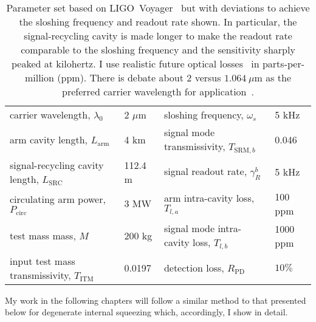 \begin{table}
\centering
\begin{tabular}{@{}ll|ll@{}}
\toprule
carrier wavelength, $\lambda_0$ & 2 $\mu\text{m}$ & sloshing frequency, $\omega_s$ & 5 kHz \\
arm cavity length, $L_\text{arm}$ & 4 km & signal mode transmissivity, $T_{\text{SRM},b}$ & 0.046 \\
signal-recycling cavity length, $L_\text{SRC}$ & 112.4 m & signal readout rate, $\gamma^b_R$ & 5 kHz \\
circulating arm power, $P_\text{circ}$ & 3 MW & arm intra-cavity loss, $T_{l,a}$ & 100 ppm \\
test mass mass, $M$ & 200 kg & signal mode intra-cavity loss, $T_{l,b}$ & 1000 ppm \\
input test mass transmissivity, $T_\text{ITM}$ & 0.0197 & detection loss, $R_\text{PD}$ & $10\%$ \\ \bottomrule
\end{tabular}
\caption{Parameter set based on LIGO~Voyager~\cite{LIGO_Voyager} but with deviations to achieve the sloshing frequency and readout rate shown. In particular, the signal-recycling cavity is made longer to make the readout rate comparable to the sloshing frequency and the sensitivity sharply peaked at kilohertz. I use realistic future optical losses~\cite{zhangBroadbandSignalRecycling2021,Danilishin_2019} in parts-per-million (ppm). There is debate about $2$ versus $1.064~\mu\text{m}$ as the preferred carrier wavelength for application~\cite{wills2018gravitational}.}
\label{tab:dIS_parameters}
\end{table}

My work in the following chapters will follow a similar method to that presented below for degenerate internal squeezing which, accordingly, I show in detail.

